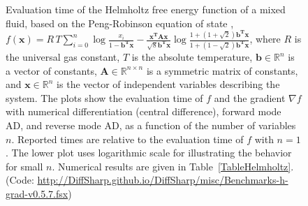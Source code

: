 \documentclass[twoside,11pt]{article}
\begin{document}
\begin{figure}
  \centering
  \trimbox{0cm -1cm}{\resizebox{0.65\textwidth}{!}{\normalsize}}
  \caption{Evaluation time of the Helmholtz free energy function of a mixed fluid, based on the Peng-Robinson equation of state \citep{Peng1976}, ${f(\mathbf{x}) = R \, T \sum_{i = 0}^{n} \log \frac{x_i}{1 - \mathbf{b^T} \mathbf{x}} - \frac{\mathbf{x^T} \mathbf{A} \mathbf{x}}{\sqrt{8} \mathbf{b^T} \mathbf{x}} \log \frac{1 + (1 + \sqrt{2}) \mathbf{b^T} \mathbf{x}}{1 + (1 - \sqrt{2}) \mathbf{b^T} \mathbf{x}}}$, where $R$ is the universal gas constant, $T$ is the absolute temperature, $\mathbf{b} \in \mathbb{R}^n$ is a vector of constants, $\mathbf{A} \in \mathbb{R}^{n \times n}$ is a symmetric matrix of constants, and $\mathbf{x} \in \mathbb{R}^n$ is the vector of independent variables describing the system. The plots show the evaluation time of $f$ and the gradient $\nabla f$ with numerical differentiation (central difference), forward mode AD, and reverse mode AD, as a function of the number of variables $n$. Reported times are relative to the evaluation time of $f$ with $n=1$. The lower plot uses logarithmic scale for illustrating the behavior for small $n$. Numerical results are given in Table~\ref{TableHelmholtz}. (Code: {\small\url{http://DiffSharp.github.io/DiffSharp/misc/Benchmarks-h-grad-v0.5.7.fsx}})}
  \label{FigureHelmholtz}
\end{figure}
\end{document}
